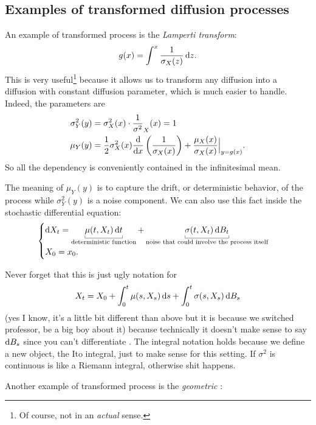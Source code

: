 \documentclass[12pt]{report}
\begin{document}
\subsection{Examples of transformed diffusion processes}
An example of transformed process is the \emph{Lamperti transform}:
\begin{equation*}
	g(x)=\int^{x}\frac{1}{\sigma_{X}(z)}\mathop{}\!\mathrm{d} z.
\end{equation*}
This is very useful\footnote{Of course, not in an \textit{actual} sense.} because it allows us to transform any diffusion into a diffusion with constant diffusion parameter, which is much easier to handle. Indeed, the parameters are
\begin{align*}
		\sigma^{2}_{Y}(y)&=\sigma^{2}_{X}(x)\cdot\frac{1}{\sigma^{2}}_{X}(x)=1\\
		\mu_{Y}(y)&=\frac{1}{2}\sigma^{2}_{X}(x)\frac{\mathop{}\!\mathrm{d}}{\mathop{}\!\mathrm{d} x}\left(\frac{1}{\sigma_{X}(x)}\right)+\frac{\mu_{X}(x)}{\sigma_{X}(x)}\Big|_{y=g(x)}.
\end{align*}
So all the dependency is conveniently contained in the infinitesimal mean.
\begin{remark}
	The meaning of $\mu_{Y}(y)$ is to capture the drift, or deterministic behavior, of the process while $\sigma^{2}_{Y}(y)$ is a noise component.
	We can also use this fact inside the stochastic differential equation:
	\begin{equation*}
		\begin{cases}
			\dif X_{t}=\ubracketthin{\mu(t,X_{t})\dt}_{\text{deterministic function}}+\ubracketthin{\sigma(t,X_{t})\dif B_{t}}_{\text{noise that could involve the process itself}}\\
			X_{0}=x_{0}.
		\end{cases}
	\end{equation*}
\end{remark}
Never forget that this is just ugly notation for
\begin{equation*}
	X_{t}=X_{0}+\int_{0}^{t}\mu(s,X_{s})\mathop{}\!\mathrm{d} s+\int_{0}^{t}\sigma(s,X_{s})\mathop{}\!\mathrm{d} B_{s}
\end{equation*}
(yes I know, it's a little bit different than above but it is because we switched professor, be a big boy about it) because technically it doesn't make sense to say $\mathop{}\!\mathrm{d} B_{s}$ since you can't differentiate \bwm. The integral notation holds because we define a new object, the Ito integral, just to make sense for this setting. If $\sigma^{2}$ is continuous is like a Riemann integral, otherwise shit happens.\par
Another example of transformed process is the \emph{geometric \bwm}:
\end{document}
